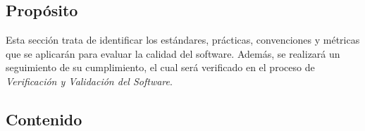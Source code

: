 \documentclass[11pt, a4paper, twoside, titlepage]{article}
\begin{document}
		\subsection{Propósito}

			Esta sección trata de identificar los estándares, prácticas, convenciones y métricas que se aplicarán para evaluar la calidad del software. Además, se realizará un seguimiento de su cumplimiento, el cual será verificado en el proceso de \textit{Verificación y Validación del Software}.

		\subsection{Contenido}
\end{document}
